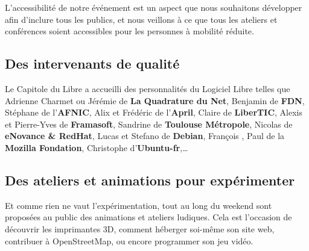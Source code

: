 \Separateur

L'accessibilité de notre événement est un aspect que nous souhaitons 
développer afin d'inclure tous les publics, et nous veillons à ce que 
tous les ateliers et conférences soient accessibles pour les personnes 
à mobilité réduite.

\subsection{Des intervenants de qualité}

Le Capitole du Libre a accueilli des personnalités du Logiciel Libre 
telles que Adrienne Charmet ou Jérémie  de \textbf{La 
Quadrature du Net}, Benjamin  de \textbf{FDN}, Stéphane 
 de l'\textbf{AFNIC}, Alix  et Frédéric 
 de l'\textbf{April}, Claire  de 
\textbf{LiberTIC}, Alexis  et Pierre-Yves  
de \textbf{Framasoft}, Sandrine  de \textbf{Toulouse 
Métropole}, Nicolas  de \textbf{eNovance \& RedHat}, Lucas 
 et Stefano  de \textbf{Debian}, 
François , Paul  de la \textbf{Mozilla 
Fondation}, Christophe  d'\textbf{Ubuntu-fr},\dots

\subsection{Des ateliers et animations pour expérimenter}


Et comme rien ne vaut l'expérimentation, tout au long du weekend sont 
proposées au public des animations et ateliers ludiques. Cela est 
l'occasion de découvrir les imprimantes 3D, comment héberger soi-même son 
site web, contribuer à OpenStreetMap, ou encore programmer son jeu vidéo.
